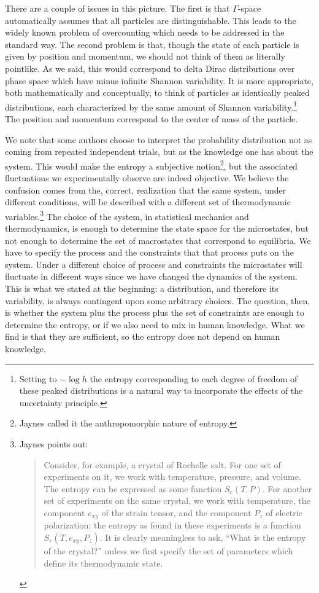 \documentclass[iopart]{revtex4-1}
\begin{document}
There are a couple of issues in this picture. The first is that $\Gamma$-space automatically assumes that all particles are distinguishable. This leads to the widely known problem of overcounting which needs to be addressed in the standard way. The second problem is that, though the state of each particle is given by position and momentum, we should not think of them as literally pointlike. As we said, this would correspond to delta Dirac distributions over phase space which have minus infinite Shannon variability. It is more appropriate, both mathematically and conceptually, to think of particles as identically peaked distributions, each characterized by the same amount of Shannon variability.\footnote{Setting to $-\log h$ the entropy corresponding to each degree of freedom of these peaked distributions is a natural way to incorporate the effects of the uncertainty principle.} The position and momentum correspond to the center of mass of the particle.

We note that some authors choose to interpret the probability distribution not as coming from repeated independent trials, but as the knowledge one has about the system. This would make the entropy a subjective notion\footnote{Jaynes\cite{Jaynes} called it the anthropomorphic nature of entropy.}, but the associated fluctuations we experimentally observe are indeed objective. We believe the confusion comes from the, correct, realization that the same system, under different conditions, will be described with a different set of thermodynamic variables.\footnote{Jaynes\cite{Jaynes} points out:
\begin{quote}
Consider, for example, a crystal of Rochelle salt. For one set of experiments on it, we work with temperature, pressure, and volume. The entropy can be expressed as some function $S_e(T,P)$. For another set of experiments on the same crystal, we work with temperature, the component $e_{xy}$ of the strain tensor, and the component $P_z$ of electric polarization; the entropy as found in these experiments is a function $S_e(T,e_{xy},P_z)$. It is clearly  meaningless to ask, ``What is the entropy of the crystal?''  unless we first specify the set of parameters which define its thermodynamic state.
\end{quote}}
The choice of the system, in statistical mechanics and thermodynamics, is enough to determine the state space for the microstates, but not enough to determine the set of macrostates that correspond to equilibria. We have to specify the process and the constraints that that process puts on the system. Under a different choice of process and constraints the microstates will fluctuate in different ways since we have changed the dynamics of the system. This is what we stated at the beginning: a distribution, and therefore its variability, is always contingent upon some arbitrary choices. The question, then, is whether the system plus the process plus the set of constraints are enough to determine the entropy, or if we also need to mix in human knowledge. What we find is that they are sufficient, so the entropy does not depend on human knowledge.
\end{document}
